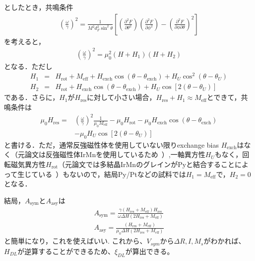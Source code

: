 \documentclass[12pt]{jsbook}
\begin{document}
としたとき，共鳴条件
\begin{eqnarray}
\left(\frac{\omega}{\gamma}\right)^{2}=\frac{1}{M^{2} d_{F}^{2} \sin ^{2} \theta}\left[\left(\frac{\partial^{2} F}{\partial \theta^{2}}\right)\left(\frac{\partial^{2} F}{\partial \phi^{2}}\right)-\left(\frac{\partial^{2} F}{\partial \phi \partial \theta}\right)^{2}\right]
\end{eqnarray}
を考えると，
\begin{eqnarray}
\left(\frac{\omega}{\gamma}\right)^{2}=\mu_{0}^{2}\left(H+H_{1}\right)\left(H+H_{2}\right)
\end{eqnarray}
となる．ただし
\begin{eqnarray}
H_{1}&=&H_{\mathrm{rot}}+M_{\mathrm{eff}}+H_{\mathrm{exch}} \cos \left(\theta-\theta_{\mathrm{exch}}\right)+H_{U} \cos ^{2}\left(\theta-\theta_{U}\right) \\
H_{2}&=&H_{\mathrm{rot}}+H_{\mathrm{exch}} \cos \left(\theta-\theta_{\mathrm{exch}}\right)+H_{U} \cos \left[2\left(\theta-\theta_{U}\right)\right]
\end{eqnarray}
である．さらに，$H_1$が$H_\mathrm{res}$に対して小さい場合，$H_\mathrm{res}+H_1 \approx M_\mathrm{eff}$とできて，共鳴条件は
\begin{eqnarray}
\mu_{0} H_{\mathrm{res}}=&\nonumber \left(\frac{\omega}{\gamma}\right)^{2} \frac{1}{\mu_{0} M_{\mathrm{eff}}}-\mu_{0} H_{\mathrm{rot}}-\mu_{0} H_{\mathrm{exch}} \cos \left(\theta-\theta_{\mathrm{exch}}\right) \\
&-\mu_{0} H_{U} \cos \left[2\left(\theta-\theta_{U}\right)\right]
\end{eqnarray}
と書ける．ただ，通常反強磁性体を使用していない限りexchange bias $H_{\mathrm{exch}}$はなく（元論文は反強磁性体IrMnを使用しているため~\cite{PhysRevB.92.214406}）,一軸異方性$H_{U}$もなく，回転磁気異方性$H_\mathrm{rot}$（元論文では多結晶IrMnのグレインがPyと結合することによって生じている~\cite{PhysRevB.92.214406}）もないので，結局Py/Ptなどの試料では$H_1=M_\mathrm{eff}$で，$H_2=0$となる．


結局，$A_{\mathrm{sym}}$と$A_{\mathrm{asy}}$は
\begin{eqnarray}
A_{\mathrm{sym}}=\frac{\gamma\left(H_{\mathrm{res}}+M_\mathrm{eff}\right)H_{\mathrm{res}}}{\omega \Delta H\left(2 H_{\mathrm{res}}+M_\mathrm{eff}\right)} \\
A_{\mathrm{asy}}=\frac{\left(H_{\mathrm{res}}+M_\mathrm{eff}\right)}{\mu_{0} \Delta H\left(2 H_{\mathrm{res}}+M_\mathrm{eff}\right)}
\end{eqnarray}
と簡単になり，これを使えばいい. これから、$V_{sym}$から$\Delta R, I, M_s$がわかれば、$H_{DL}$が逆算することができるため、$\xi_{DL}$が算出できる。
\end{document}

